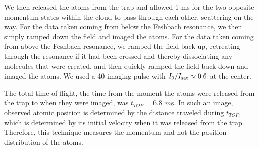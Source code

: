 \documentclass[12pt]{iopart}
\begin{document}
\par We then released the atoms from the trap and allowed 1 ms for the two opposite momentum states within the cloud to pass through each other, scattering on the way. For the data taken coming from below the Feshbach resonance, we then simply ramped down the field and imaged the atoms. For the data taken coming from above the Feshbach resonance, we ramped the field back up, retreating through the resonance if it had been crossed and thereby dissociating any molecules that were created, and then quickly ramped the field back down and imaged the atoms. We used a 40 \us{} imaging pulse with $I_0/I_{\rm{sat}}\approx 0.6$ at the center. 
\par The total time-of-flight, the time from the moment the atoms were released from the trap to when they were imaged, was $t_{TOF}=6.8$ $m\rm{s}$. In such an image, observed atomic position is determined by the distance traveled during $t_{TOF}$, which is determined by its initial velocity when it was released from the trap. Therefore, this technique measures the momentum and not the position distribution of the atoms. 
\end{document}
